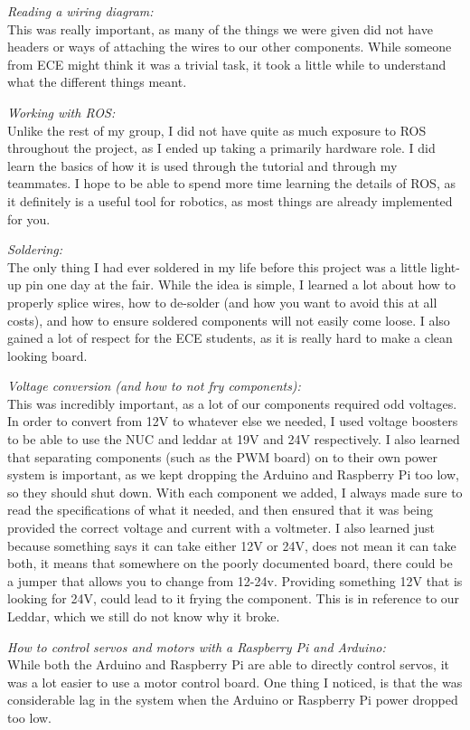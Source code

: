 \documentclass[compsoc,draftclsnofoot,onecolumn,10pt]{IEEEtran}
\begin{document}
\textit{Reading a wiring diagram:\\}
This was really important, as many of the things we were given did not have headers or ways of attaching the wires to our other components. 
While someone from ECE might think it was a trivial task, it took a little while to understand what the different things meant. 

\textit{Working with ROS:\\}
Unlike the rest of my group, I did not have quite as much exposure to ROS throughout the project, as I ended up taking a primarily hardware role. 
I did learn the basics of how it is used through the tutorial and through my teammates. I hope to be able to spend more time learning the details of ROS, as it definitely is a useful tool for robotics, as most things are already implemented for you.

\textit{Soldering:\\}
The only thing I had ever soldered in my life before this project was a little light-up pin one day at the fair. 
While the idea is simple, I learned a lot about how to properly splice wires, how to de-solder (and how you want to avoid this at all costs), and how to ensure soldered components will not easily come loose. I also gained a lot of respect for the ECE students, as it is really hard to make a clean looking board.

\textit{Voltage conversion (and how to not fry components):\\}
This was incredibly important, as a lot of our components required odd voltages. In order to convert from 12V to whatever else we needed, I used voltage boosters to be able to use the NUC and leddar at 19V and 24V respectively. I also learned that separating components (such as the PWM board) on to their own power system is important, as we kept dropping the Arduino and Raspberry Pi too low, so they should shut down. With each component we added, I always made sure to read the specifications of what it needed, and then ensured that it was being provided the correct voltage and current with a voltmeter. I also learned just because something says it can take either 12V or 24V, does not mean it can take both, it means that somewhere on the poorly documented board, there could be a jumper that allows you to change from 12-24v. Providing something 12V that is looking for 24V, could lead to it frying the component. This is in reference to our Leddar, which we still do not know why it broke. 

\textit{How to control servos and motors with a Raspberry Pi and Arduino:\\}
While both the Arduino and Raspberry Pi are able to directly control servos, it was a lot easier to use a motor control board. One thing I noticed, is that the was considerable lag in the system when the Arduino or Raspberry Pi power dropped too low. 
\end{document}
